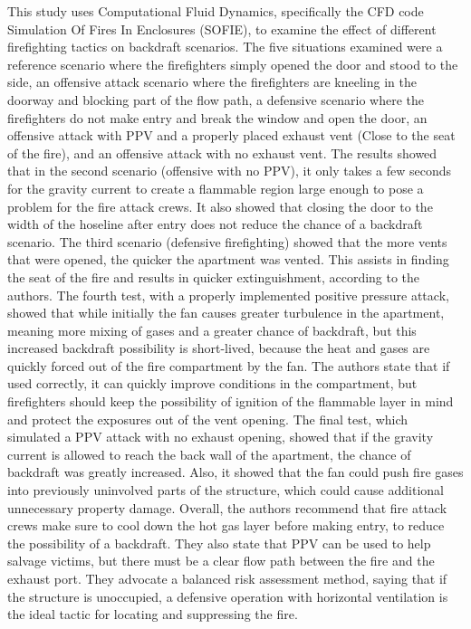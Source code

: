 \documentclass{article}
\begin{document}
\begin{appendices}
This study uses Computational Fluid Dynamics, specifically the CFD code Simulation Of Fires In Enclosures (SOFIE), to examine the effect of different firefighting tactics on backdraft scenarios. The five situations examined were a reference scenario where the firefighters simply opened the door and stood to the side, an offensive attack scenario where the firefighters are kneeling in the doorway and blocking part of the flow path, a defensive scenario where the firefighters do not make entry and break the window and open the door, an offensive attack with PPV and a properly placed exhaust vent (Close to the seat of the fire), and an offensive attack with no exhaust vent. The results showed that in the second scenario (offensive with no PPV), it only takes a few seconds for the gravity current to create a flammable region large enough to pose a problem for the fire attack crews. It also showed that closing the door to the width of the hoseline after entry does not reduce the chance of a backdraft scenario. The third scenario (defensive firefighting) showed that the more vents that were opened, the quicker the apartment was vented. This assists in finding the seat of the fire and results in quicker extinguishment, according to the authors. The fourth test, with a properly implemented positive pressure attack, showed that while initially the fan causes greater turbulence in the apartment, meaning more mixing of gases and a greater chance of backdraft, but this increased backdraft possibility is short-lived, because the heat and gases are quickly forced out of the fire compartment by the fan. The authors state that if used correctly, it can quickly improve conditions in the compartment, but firefighters should keep the possibility of ignition of the flammable layer in mind and protect the exposures out of the vent opening. The final test, which simulated a PPV attack with no exhaust opening, showed that if the gravity current is allowed to reach the back wall of the apartment, the chance of backdraft was greatly increased. Also, it showed that the fan could push fire gases into previously uninvolved parts of the structure, which could cause additional unnecessary property damage. Overall, the authors recommend that fire attack crews make sure to cool down the hot gas layer before making entry, to reduce the possibility of a backdraft. They also state that PPV can be used to help salvage victims, but there must be a clear flow path between the fire and the exhaust port. They advocate a balanced risk assessment method, saying that if the structure is unoccupied, a defensive operation with horizontal ventilation is the ideal tactic for locating and suppressing the fire.\cite{Backdraft}

\end{appendices}
\end{document}
